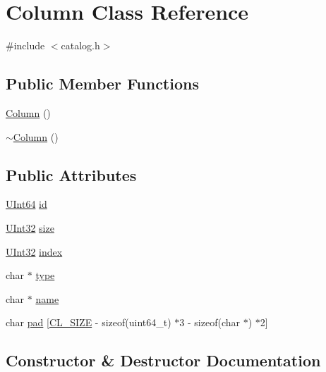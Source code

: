 \hypertarget{classColumn}{}\section{Column Class Reference}
\label{classColumn}


{\ttfamily \#include $<$catalog.\+h$>$}

\subsection*{Public Member Functions}
\begin{DoxyCompactItemize}
\item 
\hyperlink{classColumn_a74e40560a61a76cdfc3c468e2a1fa9c3}{Column} ()
\item 
\hyperlink{classColumn_aa6d1865b2d7d1bce58ca38f17bc368cd}{$\sim$\+Column} ()
\end{DoxyCompactItemize}
\subsection*{Public Attributes}
\begin{DoxyCompactItemize}
\item 
\hyperlink{global_8h_aa288382a207683aa38aca516f6edd66d}{U\+Int64} \hyperlink{classColumn_a2d6c19ce93044895d4f996d235926dde}{id}
\item 
\hyperlink{global_8h_a7e8aeec7b6541935dfc6f608cd5170ce}{U\+Int32} \hyperlink{classColumn_a21899c8b3d8fcbc223756f2f333f53a7}{size}
\item 
\hyperlink{global_8h_a7e8aeec7b6541935dfc6f608cd5170ce}{U\+Int32} \hyperlink{classColumn_a40897c4f55d38214aef281b873b9e982}{index}
\item 
char $\ast$ \hyperlink{classColumn_ac611ef0cc4f2814c13e04fa664806026}{type}
\item 
char $\ast$ \hyperlink{classColumn_abb47c8d92b4fd7a6c12f4a71b4b4dfef}{name}
\item 
char \hyperlink{classColumn_ad463769a3fac16353aae885d74068683}{pad} \mbox{[}\hyperlink{config_8h_aa18ff96566bf8c1f4cd38c1e7bc4ca80}{C\+L\+\_\+\+S\+I\+ZE} -\/ sizeof(uint64\+\_\+t) $\ast$3 -\/ sizeof(char $\ast$) $\ast$2\mbox{]}
\end{DoxyCompactItemize}


\subsection{Constructor \& Destructor Documentation}
\mbox{\label{classColumn_a74e40560a61a76cdfc3c468e2a1fa9c3}} 
